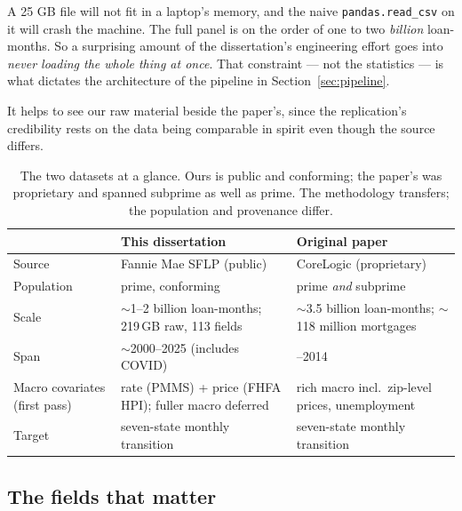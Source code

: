 \documentclass[11pt]{article}
\begin{document}
\begin{intuition}
A 25 GB file will not fit in a laptop's memory, and the naive \texttt{pandas.read\_csv}
on it will crash the machine. The full panel is on the order of one to two \emph{billion}
loan-months. So a surprising amount of the dissertation's engineering effort goes into
\emph{never loading the whole thing at once}. That constraint --- not the statistics ---
is what dictates the architecture of the pipeline in Section~\ref{sec:pipeline}.
\end{intuition}

It helps to see our raw material beside the paper's, since the replication's credibility rests
on the data being comparable in spirit even though the source differs.

\begin{table}[H]
\centering
\caption{The two datasets at a glance. Ours is public and conforming; the paper's was
proprietary and spanned subprime as well as prime. The methodology transfers; the population
and provenance differ.}
\vspace{2pt}
\small
\begin{tabular}{>{\raggedright\arraybackslash}p{4.6cm} >{\raggedright\arraybackslash}p{4.8cm} >{\raggedright\arraybackslash}p{4.8cm}}
\toprule
 & \textbf{This dissertation} & \textbf{Original paper} \\
\midrule
Source & Fannie Mae SFLP (public) & CoreLogic (proprietary) \\
Population & prime, conforming & prime \emph{and} subprime \\
Scale & $\sim$1--2 billion loan-months; 219\,GB raw, 113 fields & $\sim$3.5 billion loan-months; $\sim$118 million mortgages \\
Span & $\sim$2000--2025 (includes COVID) & 1995--2014 \\
Macro covariates (first pass) & rate (PMMS) + price (FHFA HPI); fuller macro deferred & rich macro incl.\ zip-level prices, unemployment \\
Target & seven-state monthly transition & seven-state monthly transition \\
\bottomrule
\end{tabular}
\end{table}

\subsection{The fields that matter}
\end{document}
